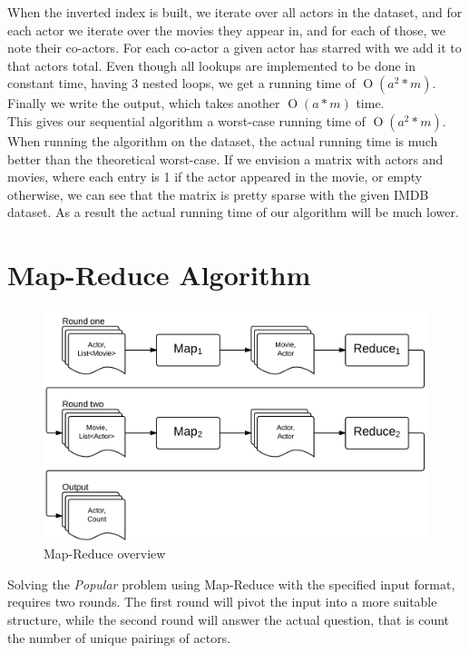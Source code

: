 \documentclass[a4paper,11pt]{article}
\newcommand{\BigO}[1]{\ensuremath{\operatorname{O}\left(#1\right)}}
\begin{document}
When the inverted index is built, we iterate over all actors in the dataset, and for each actor we iterate over the movies they appear in, and for each of those, we note their co-actors. For each co-actor a given actor has starred with we add it to that actors total. Even though all lookups are implemented to be done in constant time, having 3 nested loops, we get a running time of \BigO{a^2*m}. Finally we write the output, which takes another \BigO{a*m} time.\\

This gives our sequential algorithm a worst-case running time of \BigO{a^2*m}. When running the algorithm on the dataset, the actual running time is much better than the theoretical worst-case. If we envision a matrix with actors and movies, where each entry is 1 if the actor appeared in the movie, or empty otherwise, we can see that the matrix is pretty sparse with the given IMDB dataset. As a result the actual running time of our algorithm will be much lower.

\section{Map-Reduce Algorithm}
\label{sub:map-reduce}
\begin{figure}[H]
\centering \includegraphics[scale=0.2]{map-reduce-figure.png}
\vspace{-10pt}
\caption{Map-Reduce overview}
\label{fig:map-reduce}
\vspace{-10pt}
\end{figure}

Solving the \emph{Popular} problem using Map-Reduce with the specified input format, requires two rounds. The first round will pivot the input into a more suitable structure, while the second round will answer the actual question, that is count the number of unique pairings of actors.
\end{document}
